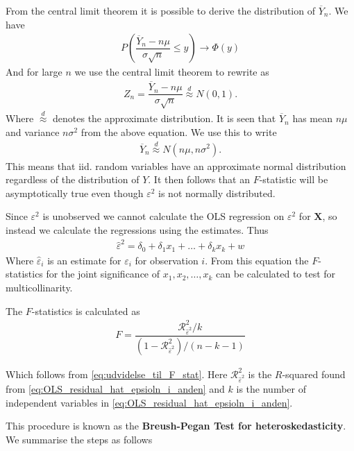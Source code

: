 From the central limit theorem it is possible to derive the distribution of $\overline{Y}_n$. We have  
\begin{align*}
    P\left(\dfrac{\overline{Y}_n - n\mu}{\sigma \sqrt{n}} \leq y\right) \rightarrow \Phi(y)
\end{align*}
And for large $n$ we use the central limit theorem to rewrite as
\begin{align*}
    Z_n = \dfrac{\overline{Y}_n - n\mu}{\sigma \sqrt{n}} \stackrel{d}{\approx} N(0,1). 
\end{align*}
Where $\stackrel{d}{\approx}$ denotes the approximate distribution. It is seen that $\overline{Y}_n$ has mean $n\mu$ and variance $n \sigma^2$ from the above equation. We use this to write
\begin{align*}
    \overline{Y}_n \stackrel{d}{\approx} N(n\mu, n\sigma^2). 
\end{align*}
This means that iid. random variables have an approximate normal distribution regardless of the distribution of $Y$. It then follows that an $F$-statistic will be asymptotically true even though $\varepsilon^2$ is not normally distributed. 

Since $\varepsilon^2$ is unobserved we cannot calculate the OLS regression on $\varepsilon^2$ for $\mathbf{X}$, so instead we calculate the regressions using the estimates. Thus
\begin{align}\label{eq:OLS_residual_hat_epsioln_i_anden}
    \hat{\varepsilon}^2 = \delta_0 + \delta_1x_1 + \ldots + \delta_kx_k + w
\end{align}
Where $\hat{\varepsilon}_i$ is an estimate for $\varepsilon_i$ for observation $i$. From this equation the $F$-statistics for the joint significance of $x_1, x_2, \ldots, x_k$ can be calculated to test for multicollinarity. 

The $F$-statistics is calculated as
\begin{align*}
    F = \dfrac{\mathcal{R}^2_{\hat{\varepsilon}^2}/k}{(1-\mathcal{R}^2_{\hat{\varepsilon}^2}) / (n-k-1)}
\end{align*}

Which follows from \eqref{eq:udvidelse_til_F_stat}. Here $\mathcal{R}^2_{\hat{\varepsilon}^2}$ is the $R$-squared found from \eqref{eq:OLS_residual_hat_epsioln_i_anden} and $k$ is the number of independent variables in \eqref{eq:OLS_residual_hat_epsioln_i_anden}. 

This procedure is known as the \textbf{Breush-Pegan Test for heteroskedasticity}. We summarise the steps as follows


